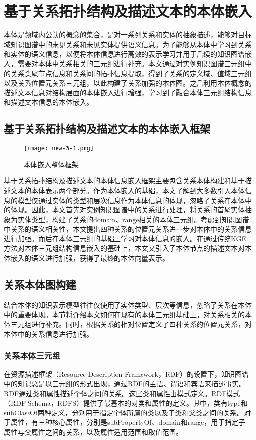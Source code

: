\chapter{基于关系拓扑结构及描述文本的本体嵌入}
本体是领域内公认的概念的集合，是对一系列关系和实体的抽象描述，能够对目标域知识图谱中的未见关系和未见实体提供语义信息。为了能够从本体中学习到关系和实体的语义信息，以便将本体信息进行高效的表示学习并用于后续的知识图谱嵌入，需要对本体中关系相关的三元组进行补充。本文通过对实例知识图谱三元组中的关系头尾节点信息和关系间的拓扑信息提取，得到了关系的定义域、值域三元组以及关系位置元关系三元组，以此构建了关系加强的本体图。之后利用本体概念的描述文本信息对结构层面的本体嵌入进行增强，学习到了融合本体三元组结构信息和描述文本信息的本体嵌入。

\section{基于关系拓扑结构及描述文本的本体嵌入框架}
\begin{figure}[h]
  \centering
  \texttt{[image: new-3-1.png]}
  \caption{本体嵌入整体框架}
  \label{fig:new-3-1}
\end{figure}

基于关系拓扑结构及描述文本的本体信息嵌入框架主要包含关系本体构建和基于描述文本的本体表示两个部分。作为本体嵌入的基础，本文了解到大多数引入本体信息的模型仅通过实体的类型和层次信息作为本体信息的体现，忽略了关系在本体中的体现。因此，本文首先对实例知识图谱中的关系进行处理，将关系的首尾实体抽象为实体类型，构建了关系的domain、range相关的本体三元组。考虑到知识图谱中关系的语义相关性，本文提出四种关系的位置元关系进一步对本体中的关系信息进行加强。而后在本体三元组的基础上学习对本体信息的嵌入。在通过传统KGE方法对本体三元组结构信息嵌入的基础上，本文又引入了本体节点的描述文本对本体嵌入的语义进行加强，获得了最终的本体向量表示。

\section{关系本体图构建}
结合本体的知识表示模型往往仅使用了实体类型、层次等信息，忽略了关系在本体中的重要体现。本节将介绍本文如何在现有的本体三元组基础上，对关系相关的本体三元组进行补充。同时，根据关系的相对位置定义了四种关系的位置元关系，对本体中的关系信息进行加强。

\subsection{关系本体三元组}
在资源描述框架（Resource Description Framework，RDF）的设置下，知识图谱中的知识总是以三元组的形式出现，通过RDF的主语、谓语和宾语来描述事实。RDF通过类和属性描述个体之间的关系。这些类和属性由模式定义。RDF模式（RDF Schema，RDFS）提供了最基本的对类和属性的定义。其中，类有type和subClassOf两种定义，分别用于指定个体所属的类以及子类和父类之间的关系。对于属性，有三种核心属性，分别是subPropertyOf、domain和range，用于指定子属性与父属性之间的关系，以及属性适用范围和取值范围。

